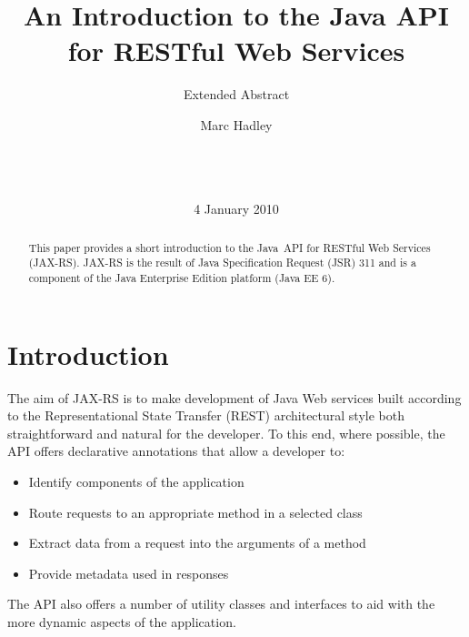 \documentclass{acm_proc_article-sp}
\begin{document}
\title{An Introduction to the Java API for RESTful Web Services}
\subtitle{Extended Abstract}

\author{
\alignauthor
Marc Hadley\\
       \\
       \\
       \\
}

\date{4 January 2010}

\maketitle
\begin{abstract}
This paper provides a short introduction to the Java\texttrademark\ API for RESTful Web Services (JAX-RS)\cite{jaxrs11}. JAX-RS is the result of Java Specification Request (JSR) 311 and is a component of the Java Enterprise Edition platform (Java EE 6)\cite{javaee6}.
\end{abstract}


\section{Introduction}

The aim of JAX-RS is to make development of Java Web services built according to the Representational State Transfer\cite{rest} (REST) architectural style both straightforward and natural for the developer. To this end, where possible, the API offers declarative annotations that allow a developer to:

\begin{itemize}
\item Identify components of the application
\item Route requests to an appropriate method in a selected class
\item Extract data from a request into the arguments of a method
\item Provide metadata used in responses
\end{itemize}

The API also offers a number of utility classes and interfaces to aid with the more dynamic aspects of the application.
\end{document}
